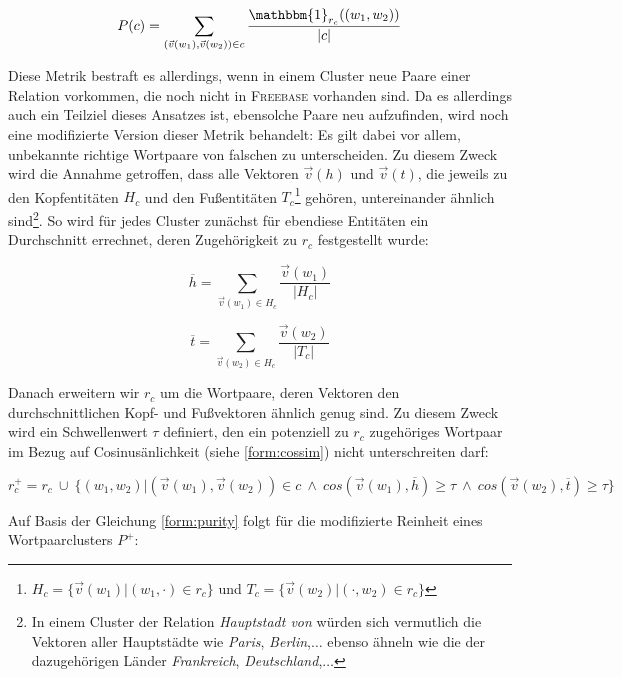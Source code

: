 \begin{equation}\label{form:purity}
    P(c) = \sum_{(\vec{v}(w_1), \vec{v}(w_2)) \in c} \frac{\mathbbm{1}_{r_c}((w_1, w_2))}{|c|}
\end{equation}

Diese Metrik bestraft es allerdings, wenn in einem Cluster neue Paare einer Relation vorkommen, die noch nicht in \textsc{Freebase}
vorhanden sind. Da es allerdings auch ein Teilziel dieses Ansatzes ist, ebensolche Paare neu aufzufinden, wird noch
eine modifizierte Version dieser Metrik behandelt: Es gilt dabei vor allem, unbekannte richtige Wortpaare von falschen
zu unterscheiden. Zu diesem Zweck wird die Annahme getroffen, dass alle Vektoren $\vec{v}(h)$ und $\vec{v}(t)$, die jeweils zu den Kopfentitäten $H_c$ und
den Fußentitäten $T_c$\footnote{$H_c = \{\vec{v}(w_1)|(w_1, \cdot) \in r_c\}$ und $T_c = \{\vec{v}(w_2)|(\cdot, w_2) \in r_c\}$} gehören,
untereinander ähnlich sind\footnote{In einem Cluster der Relation \emph{Hauptstadt von} würden
sich vermutlich die Vektoren aller Hauptstädte wie \emph{Paris}, \emph{Berlin},$\ldots$ ebenso ähneln wie die der dazugehörigen
Länder \emph{Frankreich}, \emph{Deutschland},$\ldots$}. So wird für jedes Cluster zunächst für ebendiese Entitäten ein Durchschnitt
errechnet, deren Zugehörigkeit zu $r_c$ festgestellt wurde:

\begin{equation}
  \overline{h} = \sum_{\vec{v}(w_1) \in H_c}\frac{\vec{v}(w_1)}{|H_c|}
\end{equation}

\begin{equation}
  \overline{t} = \sum_{\vec{v}(w_2) \in H_c}\frac{\vec{v}(w_2)}{|T_c|}
\end{equation}

Danach erweitern wir $r_c$ um die Wortpaare, deren Vektoren den durchschnittlichen Kopf- und Fußvektoren ähnlich genug sind.
Zu diesem Zweck wird ein Schwellenwert $\tau$ definiert, den ein potenziell zu $r_c$ zugehöriges Wortpaar im Bezug auf
Cosinusänlichkeit (siehe \ref{form:cossim}) nicht unterschreiten darf:

\begin{equation}
  r_c^+ = r_c\ \cup\ \{(w_1, w_2)| (\vec{v}(w_1), \vec{v}(w_2)) \in c\ \land\ cos(\vec{v}(w_1), \overline{h}) \geq \tau\ \land\ cos(\vec{v}(w_2), \overline{t}) \geq \tau\}
\end{equation}

Auf Basis der Gleichung \ref{form:purity} folgt für die modifizierte Reinheit eines Wortpaarclusters $P^+$:

